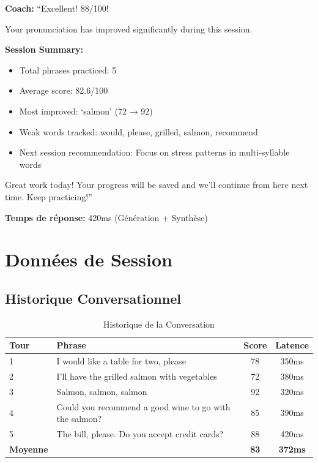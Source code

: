 \documentclass[12pt,a4paper,oneside]{report}
\begin{document}
\begin{tcolorbox}[colback=coachgreen!10, colframe=coachgreen, title=Coach IA - Résumé de Session]
\textbf{Coach:} ``Excellent! 88/100! 

Your pronunciation has improved significantly during this session. 

\textbf{Session Summary:}
\begin{itemize}
    \item Total phrases practiced: 5
    \item Average score: 82.6/100
    \item Most improved: `salmon' (72 → 92)
    \item Weak words tracked: would, please, grilled, salmon, recommend
    \item Next session recommendation: Focus on stress patterns in multi-syllable words
\end{itemize}

Great work today! Your progress will be saved and we'll continue from here next time. 
Keep practicing!''
\end{tcolorbox}

\vspace{0.5cm}

\textbf{Temps de réponse:} 420ms (Génération + Synthèse)

\newpage

\chapter{Données de Session}

\section{Historique Conversationnel}

\begin{table}[H]
\centering
\caption{Historique de la Conversation}
\label{tab:conversation_history}
\begin{tabular}{|l|l|c|c|}
\hline
\textbf{Tour} & \textbf{Phrase} & \textbf{Score} & \textbf{Latence} \\
\hline
1 & I would like a table for two, please & 78 & 350ms \\
\hline
2 & I'll have the grilled salmon with vegetables & 72 & 380ms \\
\hline
3 & Salmon, salmon, salmon & 92 & 320ms \\
\hline
4 & Could you recommend a good wine to go with the salmon? & 85 & 390ms \\
\hline
5 & The bill, please. Do you accept credit cards? & 88 & 420ms \\
\hline
\textbf{Moyenne} & & \textbf{83} & \textbf{372ms} \\
\hline
\end{tabular}
\end{table}
\end{document}
